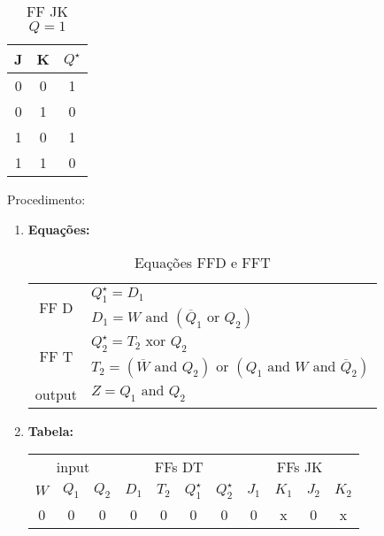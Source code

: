\documentclass{article}
\begin{document}
\begin{resolution}
\begin{center}
\begin{minipage}{0.3\linewidth}
\begin{table}[H]
                \centering\begin{tabular}[]{cc|c}
                    J & K & $Q^\star$\\\hline
                    0 & 0 & 1\\
                    0 & 1 & 0\\
                    1 & 0 & 1\\
                    1 & 1 & 0\\\hline
                \end{tabular}\caption{FF JK $Q=1$}
                \end{table}
        \end{minipage}
        \end{center}
        Procedimento:
        \begin{enumerate}[rightmargin = \leftmargin, noitemsep]
            \item \textbf{Equações:}
            \begin{table}[H]
                \centering\begin{tabular}[]{cl}\hline
                    \multirow{2}{*}{FF D} & $Q_1^\star = D_1$\\
                                          & $D_1 = W \text{ and }(\overline{Q}_1 \text{ or } Q_2)$\\\hline
                    \multirow{2}{*}{FF T} & $Q_2^\star = T_2 \text{ xor } Q_2$\\
                                          & $T_2 = (\overline{W} \text{ and } Q_2) \text{ or } (Q_1 \text{ and } W \text{ and }\overline{Q}_2)$\\\hline
                    output                & $Z = Q_1 \text{ and } Q_2$\\\hline
                \end{tabular}\caption{Equações FFD e FFT}
            \end{table}
            \item \textbf{Tabela:}
            \begin{table}[H]
                \centering
                \begin{tabular}[]{ccc|c|c|cc|cc|cc}
                    \multicolumn{3}{c|}{input}& \multicolumn{4}{c|}{FFs DT}              & \multicolumn{4}{c}{FFs JK}\\
                    $W$ & $Q_1$ & $Q_2$       & $D_1$ & $T_2$ & $Q_1^\star$ & $Q_2^\star$&$J_1$&$K_1$&$J_2$&$K_2$\\\hline
                     0  &  0    &  0          & 0     & 0     & 0           & 0          & 0   & x   & 0   & x \\

\end{tabular}
\end{table}
\end{enumerate}
\end{resolution}
\end{document}
